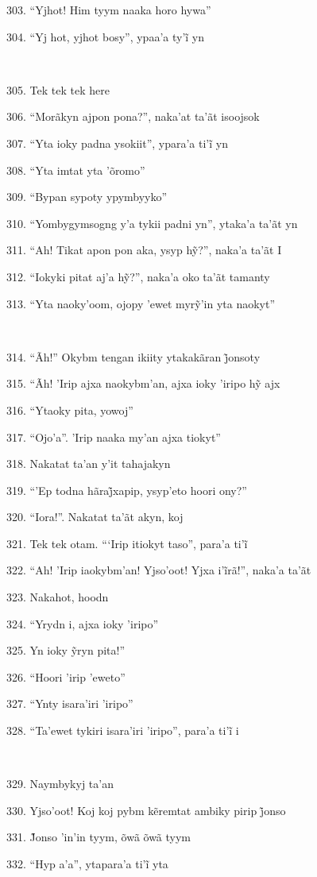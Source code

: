 303. ``Yjhot! Him tyym naaka horo hywa''

304. “Yj hot, yjhot bosy”, ypaa’a ty’ĩ yn

~

305. Tek tek tek here

306. ``Morãkyn ajpon pona?'', naka'at ta'ãt isoojsok

307. “Yta ioky padna ysokiit”, ypara’a ti’ĩ yn

308. ``Yta imtat yta 'õromo''

309. ``Bypan sypoty ypymbyyko''

310. ``Yombygymsogng y'a tykii padni yn'', ytaka'a ta'ãt yn

311. “Ah! Tikat apon pon aka, ysyp hỹ?”, naka’a ta’ãt I

312. “Iokyki pitat aj’a hỹ?”, naka’a oko ta’ãt tamanty

313. “Yta naoky’oom, ojopy ’ewet myrỹ’in yta naokyt”

~

314. “Ãh!” Okybm tengan ikiity ytakakãran j̃onsoty

315. “Ãh! ’Irip ajxa naokybm’an, ajxa ioky ’iripo hỹ ajx

316. ``Ytaoky pita, yowoj''

317. ``Ojo'a''. 'Irip naaka my'an ajxa tiokyt''

318. Nakatat ta'an y'it tahajakyn

319. “’Ep todna hãraj̃xapip, ysyp’eto hoori ony?”

320. ``Iora!''. Nakatat ta'ãt akyn, koj

321. Tek tek otam. “‘Irip itiokyt taso”, para’a ti’ĩ

322. “Ah! ’Irip iaokybm’an! Yjso’oot! Yjxa i’ĩrã!”, naka’a ta’ãt

323. Nakahot, hoodn

324. ``Yrydn i, ajxa ioky 'iripo''

325. Yn ioky ỹryn pita!”

326. ``Hoori 'irip 'eweto''

327. ``Ynty isara'iri 'iripo''

328. “Ta’ewet tykiri isara’iri ’iripo”, para’a ti’ĩ i

~

329. Naymbykyj ta'an

330. Yjso’oot! Koj koj pybm kẽremtat ambiky pirip j̃onso

331. J̃onso ’in’in tyym, õwã õwã tyym

332. “Hyp a’a”, ytapara’a ti’ĩ yta

